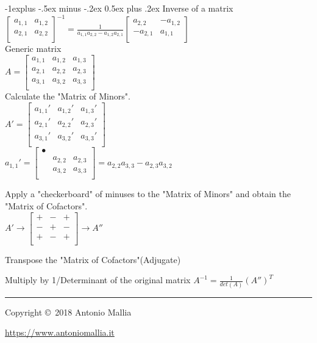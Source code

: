 \documentclass[10pt,letterpaper]{article}
\makeatletter
\renewcommand{\subsection}{\@startsection{subsection}{2}{0mm}%
                                {-1explus -.5ex minus -.2ex}%
                                {0.5ex plus .2ex}%
                                {\normalfont\normalsize\bfseries}}
\makeatother
\begin{document}
\begin{multicols}{3}
\subsection{Inverse of a matrix}
$\begin{bmatrix}
    a_{1,1} & a_{1,2} \\
    a_{2,1} & a_{2,2} \\
\end{bmatrix} ^{-1} = 
\frac{1}{a_{1,1} a_{2,2} - a_{1,2} a_{2,1}}
\begin{bmatrix}
	a_{2,2} & -a_{1,2} \\
    -a_{2,1} & a_{1,1} \\
\end{bmatrix}
$ \\
Generic matrix\\
$A = \begin{bmatrix}
    a_{1,1} & a_{1,2} & a_{1,3} \\
    a_{2,1} & a_{2,2} & a_{2,3} \\
    a_{3,1} & a_{3,2} & a_{3,3} \\
\end{bmatrix}$ \\ 

Calculate the "Matrix of Minors".\\
$A' = \begin{bmatrix}
    a_{1,1}' & a_{1,2}' & a_{1,3}' \\
    a_{2,1}' & a_{2,2}' & a_{2,3}' \\
    a_{3,1}' & a_{3,2}' & a_{3,3}' \\
\end{bmatrix}$\\

$a_{1,1}' = \begin{bmatrix}
    \bullet &  &  \\
    	 & a_{2,2} & a_{2,3} \\
    	 & a_{3,2} & a_{3,3} \\
\end{bmatrix} = a_{2,2} a_{3,3} - a_{2,3}a_{3,2}$

Apply a "checkerboard" of minuses to the "Matrix of Minors" and obtain the "Matrix of Cofactors". \\
$A' \rightarrow \begin{bmatrix}
    + & - & + \\
    - & + & - \\
    + & - & + \\
\end{bmatrix} \rightarrow A''$

Transpose the "Matrix of Cofactors"(Adjugate)

Multiply by 1/Determinant of the original matrix
$A^{-1} = \frac{1}{det(A)} (A'')^T$
\smallskip
\rule{0.3\linewidth}{0.25pt}
\scriptsize

Copyright \copyright\ 2018 Antonio Mallia

\href{https://www.antoniomallia.it}{https://www.antoniomallia.it}

\end{multicols}
\end{document}
